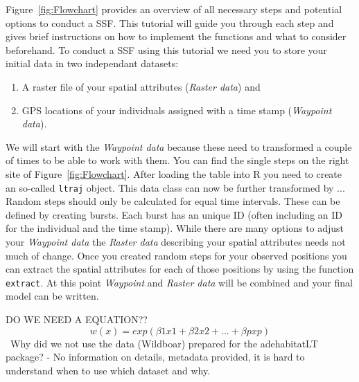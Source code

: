 \documentclass[11pt, a4paper]{article} %
\begin{document}
Figure~\ref{fig:Flowchart} provides an overview of all necessary steps and potential options to conduct a SSF. This tutorial will guide you through each step and gives brief instructions on how to implement the functions and what to consider beforehand.
To conduct a SSF using this tutorial we need you to store your initial data  in two independant datasets: \begin{enumerate} \item {A raster file of your spatial attributes (\emph{Raster data})} and \item{GPS locations of your individuals assigned with a time stamp (\emph{Waypoint data})}. \end{enumerate} 
We will start with the \emph{Waypoint data} because these need to transformed a couple of times to be able to work with them. You can find the single steps on the right site of Figure~\ref{fig:Flowchart}. After loading the table into R you need to create an so-called \texttt{ltraj} object. This data class can now be further transformed by ... Random steps should only be calculated for equal time intervals. These can be defined by creating bursts. Each burst has an unique ID (often including an ID for the individual and the time stamp). While there are many options to adjust your \emph{Waypoint data} the \emph{Raster data} describing your spatial attributes needs not much of change. Once you created random steps for your observed positions you can extract the spatial attributes for each of those positions by using the function \texttt{extract}. At this point \emph{Waypoint} and \emph{Raster data} will be combined and your final model can be written.   


DO WE NEED A EQUATION??
\[
\displaystyle w(x) = exp(\beta1 x1 + \beta2x2 + ... + \beta p xp)
\]
\
Why did we not use the data (Wildboar) prepared for the adehabitatLT package? - No information on details, metadata provided, it is hard to understand when to use which dataset and why.
\newpage
\end{document}
